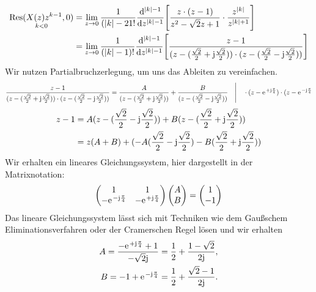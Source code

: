 \documentclass[11pt,a4paper,DIV=12]{scrartcl}
\begin{document}
\begin{align}
	\underset{k<0}{\mathrm{Res}(X(z)z^{k-1},0)}&=\lim\limits_{z\rightarrow0}\frac{1}{(|k|-21!}\frac{\mathrm{d}^{|k|-1}}{\mathrm{d}z^{|k|-1}}\Bigg[\frac{z\cdot(z-1)}{z^2-\sqrt{2}z+1}\cdot\frac{z^{|k|}}{z^{|k|+1}}\Bigg ]\nonumber\\
	&=\lim\limits_{z\rightarrow0}\frac{1}{(|k|-1)!}\frac{\mathrm{d}^{|k|-1}}{\mathrm{d}z^{|k|-1}}\Bigg[\frac{z-1}{(z-(\frac{\sqrt{2}}{2}+\im\frac{\sqrt{2}}{2}))\cdot(z-(\frac{\sqrt{2}}{2}-\im\frac{\sqrt{2}}{2}))}\Bigg ]
\end{align}
Wir nutzen Partialbruchzerlegung, um uns das Ableiten zu vereinfachen.
\begin{align}
	\frac{z-1}{(z-(\frac{\sqrt{2}}{2}+\im\frac{\sqrt{2}}{2}))\cdot(z-(\frac{\sqrt{2}}{2}-\im\frac{\sqrt{2}}{2}))}=\frac{A}{(z-(\frac{\sqrt{2}}{2}+\im\frac{\sqrt{2}}{2}))}+\frac{B}{(z-(\frac{\sqrt{2}}{2}-\im\frac{\sqrt{2}}{2}))}\quad\Bigg|\quad\cdot (z-\e^{+\im\frac{\pi}{4}})\cdot(z-\e^{-\im\frac{\pi}{4}} \nonumber
\end{align}
\begin{align}
	z-1&=A(z-(\frac{\sqrt{2}}{2}-\im\frac{\sqrt{2}}{2}))+B(z-(\frac{\sqrt{2}}{2}+\im\frac{\sqrt{2}}{2}))\nonumber \\
	&=z(A+B)+(-A(\frac{\sqrt{2}}{2}-\im\frac{\sqrt{2}}{2})-B(\frac{\sqrt{2}}{2}+\im\frac{\sqrt{2}}{2}))
\end{align}
Wir erhalten ein lineares Gleichungssystem, hier dargestellt in der Matrixnotation:
\begin{align}
	\begin{pmatrix}
		1 & 1 \\
		-\e^{-\im\frac{\pi}{4}} & -\e^{+\im\frac{\pi}{4}}
	\end{pmatrix}
	\begin{pmatrix}
		A \\
		B
	\end{pmatrix}
	=
	\begin{pmatrix}
		1 \\
		-1
	\end{pmatrix}
\end{align}
Das lineare Gleichungssystem lässt sich mit Techniken wie dem Gaußschem Eliminationsverfahren oder der Cramerschen Regel lösen und wir erhalten
\begin{align}
	A=\frac{-\e^{+\im\frac{\pi}{4}}+1}{-\sqrt{2}\im}=\frac{1}{2}+\frac{1-\sqrt{2}}{2\im}, \nonumber\\
	B=-1+\e^{-\im\frac{\pi}{4}}=\frac{1}{2}+\frac{\sqrt{2}-1}{2\im}.
\end{align}
\end{document}
